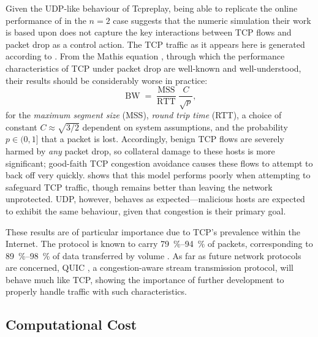 \documentclass[conference, letterpaper, 10pt, times]{IEEEtran}
\begin{document}
Given the UDP-like behaviour of Tcpreplay, being able to replicate the online performance of \citeauthor{DBLP:journals/eaai/MalialisK15} in the $n=2$ case suggests that the numeric simulation their work is based upon does not capture the key interactions between TCP flows and packet drop as a control action.
The TCP traffic as it appears here is generated according to .
From the Mathis equation \cite{DBLP:journals/ccr/MathisSMO97}, through which the performance characteristics of TCP under packet drop are well-known and well-understood, their results should be considerably worse in practice:
\begin{equation}
\operatorname{BW} = \frac{\operatorname{MSS}}{\operatorname{RTT}} \frac{C}{\sqrt{p}},
\end{equation}
for the \emph{maximum segment size} (MSS), \emph{round trip time} (RTT), a choice of constant $C \approx{} \sqrt{3/2}$ dependent on system assumptions, and the probability $p \in (0, 1]$ that a packet is lost.
Accordingly, benign TCP flows are severely harmed by \emph{any} packet drop, so collateral damage to these hosts is more significant; good-faith TCP congestion avoidance causes these flows to attempt to back off very quickly.
 shows that this model performs poorly when attempting to safeguard TCP traffic, though remains better than leaving the network unprotected.
UDP, however, behaves as expected---malicious hosts are expected to exhibit the same behaviour, given that congestion is their primary goal.

These results are of particular importance due to TCP's prevalence within the Internet.
The protocol is known to carry \SIrange{79}{94}{\percent} of packets, corresponding to \SIrange{89}{98}{\percent} of data transferred by volume \cite{DBLP:conf/saint/ZhangDJC09}.
As far as future network protocols are concerned, QUIC \cite{DBLP:conf/sigcomm/LangleyRWVKZYKS17}, a congestion-aware stream transmission protocol, will behave much like TCP, showing the importance of further development to properly handle traffic with such characteristics.

\subsection{Computational Cost}
\end{document}
